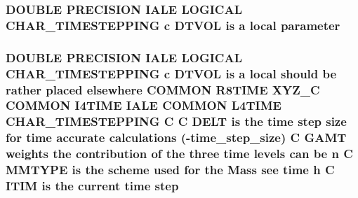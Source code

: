 \hypertarget{home_2abonfi_2_c_f_d__codes_2_eul_f_s_83_84_2include_2time_8com_af6b21c8db5d86244135ffb1ede1e0268}{
\subsubsection[{parameter}]{\setlength{\rightskip}{0pt plus 5cm}D\-O\-U\-B\-L\-E P\-R\-E\-C\-I\-S\-I\-O\-N I\-A\-L\-E L\-O\-G\-I\-C\-A\-L C\-H\-A\-R\-\_\-\-T\-I\-M\-E\-S\-T\-E\-P\-P\-I\-N\-G c {\bf D\-T\-V\-O\-L} is a local parameter}}\label{home_2abonfi_2_c_f_d__codes_2_eul_f_s_83_84_2include_2time_8com_af6b21c8db5d86244135ffb1ede1e0268}
\hypertarget{home_2abonfi_2_c_f_d__codes_2_eul_f_s_83_84_2include_2time_8com_a3afa77097ad8466eb34858ba6f60aad2}{
\subsubsection[{step}]{\setlength{\rightskip}{0pt plus 5cm}D\-O\-U\-B\-L\-E P\-R\-E\-C\-I\-S\-I\-O\-N I\-A\-L\-E L\-O\-G\-I\-C\-A\-L C\-H\-A\-R\-\_\-\-T\-I\-M\-E\-S\-T\-E\-P\-P\-I\-N\-G c {\bf D\-T\-V\-O\-L} is a local should be rather placed elsewhere C\-O\-M\-M\-O\-N R8\-T\-I\-M\-E {\bf X\-Y\-Z\-\_\-\-C} C\-O\-M\-M\-O\-N I4\-T\-I\-M\-E I\-A\-L\-E C\-O\-M\-M\-O\-N L4\-T\-I\-M\-E C\-H\-A\-R\-\_\-\-T\-I\-M\-E\-S\-T\-E\-P\-P\-I\-N\-G C C {\bf D\-E\-L\-T} is the time step size for time accurate calculations (-\/time\-\_\-step\-\_\-size) C {\bf G\-A\-M\-T} weights the contribution of the three time levels can be {\bf n} C {\bf M\-M\-T\-Y\-P\-E} is the scheme {\bf used} for the Mass see time h C {\bf I\-T\-I\-M} is the current time step}}\label{home_2abonfi_2_c_f_d__codes_2_eul_f_s_83_84_2include_2time_8com_a3afa77097ad8466eb34858ba6f60aad2}
